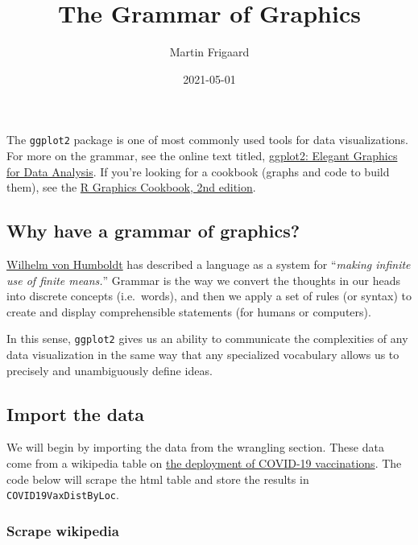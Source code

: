 \documentclass[11pt,]{article}
\title{The Grammar of Graphics}
\author{Martin Frigaard}
\date{2021-05-01}
\begin{document}
\maketitle

\thispagestyle{firststyle}


{
\hypersetup{linkcolor=black}
\setcounter{tocdepth}{2}
\tableofcontents
}

The \texttt{ggplot2} package is one of most commonly used tools for data
visualizations. For more on the grammar, see the online text titled,
\href{https://ggplot2-book.org/}{ggplot2: Elegant Graphics for Data
Analysis}. If you're looking for a cookbook (graphs and code to build
them), see the \href{https://r-graphics.org/}{R Graphics Cookbook, 2nd
edition}.

\hypertarget{why-have-a-grammar-of-graphics}{%
\subsection{Why have a grammar of
graphics?}\label{why-have-a-grammar-of-graphics}}

\href{https://en.wikipedia.org/wiki/Wilhelm_von_Humboldt}{Wilhelm von
Humboldt} has described a language as a system for ``\emph{making
infinite use of finite means.}'' Grammar is the way we convert the
thoughts in our heads into discrete concepts (i.e.~words), and then we
apply a set of rules (or syntax) to create and display comprehensible
statements (for humans or computers).

In this sense, \texttt{ggplot2} gives us an ability to communicate the
complexities of any data visualization in the same way that any
specialized vocabulary allows us to precisely and unambiguously define
ideas.

\hypertarget{import-the-data}{%
\subsection{Import the data}\label{import-the-data}}

We will begin by importing the data from the wrangling section. These
data come from a wikipedia table on
\href{https://en.wikipedia.org/wiki/Deployment_of_COVID-19_vaccines\#Distribution}{the
deployment of COVID-19 vaccinations}. The code below will scrape the
html table and store the results in \texttt{COVID19VaxDistByLoc}.

\hypertarget{scrape-wikipedia}{%
\subsubsection{Scrape wikipedia}\label{scrape-wikipedia}}
\end{document}
